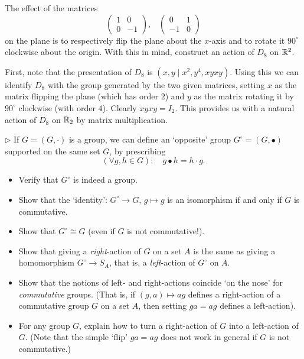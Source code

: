 \begin{problem}
	The effect of the matrices
	\[
		\begin{pmatrix}
			1 & 0 \\
			0 & -1
		\end{pmatrix}\text{,}\quad
		\begin{pmatrix}
			0 & 1 \\
			-1 & 0
		\end{pmatrix}
	\]
	on the plane is to respectively flip the plane about the $x$-axis and to rotate it $90^{\circ}$ clockwise about the origin. With this in mind, construct an action of $D_8$ on $\mathbb{R}^2$.
\end{problem}

\begin{solution}
	First, note that the presentation of $D_8$ is $(x, y \mid x^2, y^4, xyxy)$. Using this we can identify $D_8$ with the group generated by the two given matrices, setting $x$ as the matrix flipping the plane (which has order $2$) and $y$ as the matrix rotating it by $90^{\circ}$ clockwise (with order $4$). Clearly $xyxy = I_2$. This provides us with a natural action of $D_8$ on $\mathbb{R}_2$ by matrix multiplication.
\end{solution}

\begin{problem}
	$\triangleright$ If $G = (G, \cdot)$ is a group, we can define an `opposite' group $G^{\circ} = (G, \bullet)$ supported on the same set $G$, by prescribing
	\[
		(\forall g, h \in G): \quad g \bullet h = h \cdot g \text{.}
	\]
	\begin{itemize}
		\item Verify that $G^{\circ}$ is indeed a group.
		\item Show that the `identity': $G^{\circ} \to G$, $g \mapsto g$ is an isomorphism if and only if $G$ is commutative.
		\item Show that $G^{\circ} \cong G$ (even if $G$ is not commutative!).
		\item Show that giving a \emph{right}-action of $G$ on a set $A$ is the same as giving a homomorphism $G^{\circ} \to S_A$, that is, a \emph{left}-action of $G^{\circ}$ on $A$.
		\item Show that the notions of left- and right-actions coincide `on the nose' for \emph{commutative} groups. (That is, if $(g, a) \mapsto ag$ defines a right-action of a commutative group $G$ on a set $A$, then setting $ga = ag$ defines a left-action).
		\item For any group $G$, explain how to turn a right-action of $G$ into a left-action of $G$. (Note that the simple `flip' $ga = ag$ does not work in general if $G$ is not commutative.)
	\end{itemize}
\end{problem}

